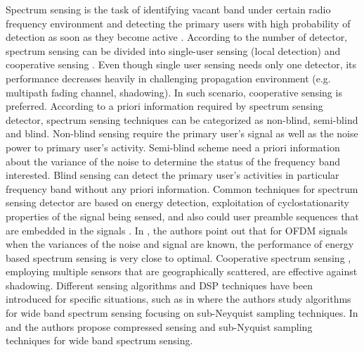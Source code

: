 \documentclass{report}
\begin{document}
\begin{spacing}{2.0}
Spectrum sensing is the task of identifying vacant band under certain radio frequency environment and detecting the primary users with high probability of detection as soon as they become active \cite{umar2012spectrum}. According to the number of detector, spectrum sensing can be divided into single-user sensing (local detection) \cite{axell2010overview} \cite{wang2011advances} and cooperative sensing \cite{akyildiz2011cooperative}. Even though single user sensing needs only one detector, its performance decreases heavily in challenging propagation environment (e.g. multipath fading channel, shadowing). In such scenario, cooperative sensing is preferred.  
According to a priori information required by spectrum sensing detector, spectrum sensing techniques can be categorized as non-blind, semi-blind and blind. Non-blind sensing require the primary user's signal as well as the noise power to primary user's activity. Semi-blind scheme need a priori information about the variance of the noise to determine the status of the frequency band interested. Blind sensing can detect the primary user's activities in particular frequency band without any priori information. 
Common techniques for spectrum sensing detector are based on energy detection, exploitation of cyclostationarity properties of the signal being sensed, and also could user preamble sequences that are embedded in the signals \cite{cabric2004implementation}. In \cite{axell2011optimal}, the authors point out that for OFDM signals when the variances of the noise and signal are known, the performance of energy based spectrum sensing is very close to optimal. Cooperative spectrum sensing \cite{ganesan2005cooperative}, employing multiple sensors that are geographically scattered, are effective against shadowing.
Different sensing algorithms and DSP techniques have been introduced for specific situations, such as in \cite{tian2007compressed} where the authors study algorithms for wide band spectrum sensing focusing on sub-Neyquist sampling techniques. In  \cite{sun2013wideband} and  \cite{sun2013wideband2} the authors propose compressed sensing and sub-Nyquist sampling techniques for wide band spectrum sensing.


\end{spacing}
\end{document}
